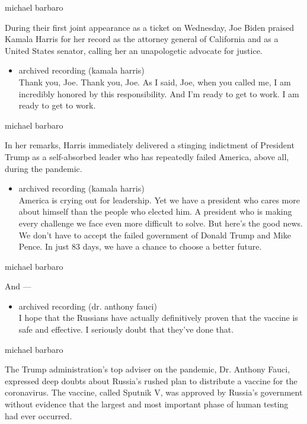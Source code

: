 michael barbaro

During their first joint appearance as a ticket on Wednesday, Joe Biden
praised Kamala Harris for her record as the attorney general of
California and as a United States senator, calling her an unapologetic
advocate for justice.

\begin{itemize}
\tightlist
\item
  archived recording (kamala harris)\\
  Thank you, Joe. Thank you, Joe. As I said, Joe, when you called me, I
  am incredibly honored by this responsibility. And I'm ready to get to
  work. I am ready to get to work.
\end{itemize}

michael barbaro

In her remarks, Harris immediately delivered a stinging indictment of
President Trump as a self-absorbed leader who has repeatedly failed
America, above all, during the pandemic.

\begin{itemize}
\tightlist
\item
  archived recording (kamala harris)\\
  America is crying out for leadership. Yet we have a president who
  cares more about himself than the people who elected him. A president
  who is making every challenge we face even more difficult to solve.
  But here's the good news. We don't have to accept the failed
  government of Donald Trump and Mike Pence. In just 83 days, we have a
  chance to choose a better future.
\end{itemize}

michael barbaro

And ---

\begin{itemize}
\tightlist
\item
  archived recording (dr. anthony fauci)\\
  I hope that the Russians have actually definitively proven that the
  vaccine is safe and effective. I seriously doubt that they've done
  that.
\end{itemize}

michael barbaro

The Trump administration's top adviser on the pandemic, Dr. Anthony
Fauci, expressed deep doubts about Russia's rushed plan to distribute a
vaccine for the coronavirus. The vaccine, called Sputnik V, was approved
by Russia's government without evidence that the largest and most
important phase of human testing had ever occurred.


